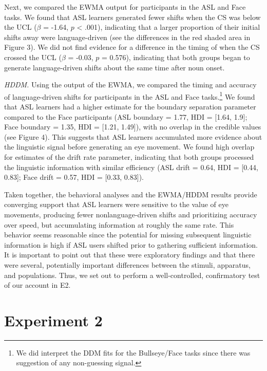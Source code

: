 \documentclass[10pt, letterpaper]{article}
\begin{document}
Next, we compared the EWMA output for participants in the ASL and Face
tasks. We found that ASL learners generated fewer shifts when the CS was
below the UCL (\(\beta\) = -1.64, \(p\) \textless{} .001), indicating
that a larger proportion of their initial shifts away were
language-driven (see the differences in the red shaded area in Figure
3). We did not find evidence for a difference in the timing of when the
CS crossed the UCL (\(\beta\) = -0.03, \(p\) = 0.576), indicating that
both groups began to generate language-driven shifts about the same time
after noun onset.

\emph{HDDM.} Using the output of the EWMA, we compared the timing and
accuracy of language-driven shifts for participants in the ASL and Face
tasks.\footnote{We did interpret the DDM fits for the Bullseye/Face
  tasks since there was suggestion of any non-guessing signal.} We found
that ASL learners had a higher estimate for the boundary separation
parameter compared to the Face participants (ASL boundary = 1.77, HDI =
{[}1.64, 1.9{]}; Face boundary = 1.35, HDI = {[}1.21, 1.49{]}), with no
overlap in the credible values (see Figure 4). This suggests that ASL
learners accumulated more evidence about the linguistic signal before
generating an eye movement. We found high overlap for estimates of the
drift rate parameter, indicating that both groups processed the
linguistic information with similar efficiency (ASL drift = 0.64, HDI =
{[}0.44, 0.83{]}; Face drift = 0.57, HDI = {[}0.33, 0.83{]}).

Taken together, the behavioral analyses and the EWMA/HDDM results
provide converging support that ASL learners were sensitive to the value
of eye movements, producing fewer nonlanguage-driven shifts and
prioritizing accuracy over speed, but accumulating information at
roughly the same rate. This behavior seems reasonable since the
potential for missing subsequent linguistic information is high if ASL
users shifted prior to gathering sufficient information. It is important
to point out that these were exploratory findings and that there were
several, potentially important differences between the stimuli,
apparatus, and populations. Thus, we set out to perform a
well-controlled, confirmatory test of our account in E2.

\section{Experiment 2}\label{experiment-2}
\end{document}
